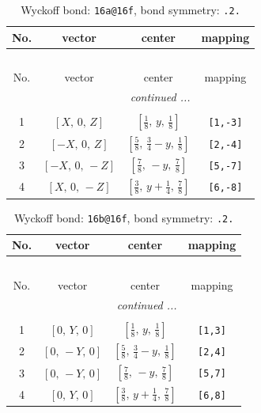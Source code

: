 \documentclass[fleqn,8pt]{jsarticle}
\begin{document}
\begin{longtable}{cccc}
\caption{Wyckoff bond: {\tt 16a@16f}, bond symmetry: {\tt .2.}}
 \\
 \hline \hline
No. & vector & center & mapping \\ \hline \endfirsthead

\multicolumn{3}{l}{\tablename\ \thetable{}} \\
 \hline \hline
No. & vector & center & mapping \\ \hline \endhead

 \hline \hline
\multicolumn{3}{r}{\footnotesize\it continued ...} \\ \endfoot

 \hline \hline
\multicolumn{3}{r}{} \\ \endlastfoot

1 & $\left[ X,\, 0,\, Z \right]$ & $\left[ \frac{1}{8},\, y,\, \frac{1}{8} \right]$ & {\tt [1,-3]} \\ \hline
2 & $\left[ - X,\, 0,\, Z \right]$ & $\left[ \frac{5}{8},\, \frac{3}{4} - y,\, \frac{1}{8} \right]$ & {\tt [2,-4]} \\ \hline
3 & $\left[ - X,\, 0,\, - Z \right]$ & $\left[ \frac{7}{8},\, - y,\, \frac{7}{8} \right]$ & {\tt [5,-7]} \\ \hline
4 & $\left[ X,\, 0,\, - Z \right]$ & $\left[ \frac{3}{8},\, y + \frac{1}{4},\, \frac{7}{8} \right]$ & {\tt [6,-8]} \\
\end{longtable}
\renewcommand{\arraystretch}{1.2}
\begin{longtable}{cccc}
\caption{Wyckoff bond: {\tt 16b@16f}, bond symmetry: {\tt .2.}}
 \\
 \hline \hline
No. & vector & center & mapping \\ \hline \endfirsthead

\multicolumn{3}{l}{\tablename\ \thetable{}} \\
 \hline \hline
No. & vector & center & mapping \\ \hline \endhead

 \hline \hline
\multicolumn{3}{r}{\footnotesize\it continued ...} \\ \endfoot

 \hline \hline
\multicolumn{3}{r}{} \\ \endlastfoot

1 & $\left[ 0,\, Y,\, 0 \right]$ & $\left[ \frac{1}{8},\, y,\, \frac{1}{8} \right]$ & {\tt [1,3]} \\ \hline
2 & $\left[ 0,\, - Y,\, 0 \right]$ & $\left[ \frac{5}{8},\, \frac{3}{4} - y,\, \frac{1}{8} \right]$ & {\tt [2,4]} \\ \hline
3 & $\left[ 0,\, - Y,\, 0 \right]$ & $\left[ \frac{7}{8},\, - y,\, \frac{7}{8} \right]$ & {\tt [5,7]} \\ \hline
4 & $\left[ 0,\, Y,\, 0 \right]$ & $\left[ \frac{3}{8},\, y + \frac{1}{4},\, \frac{7}{8} \right]$ & {\tt [6,8]} \\
\end{longtable}
\end{document}
